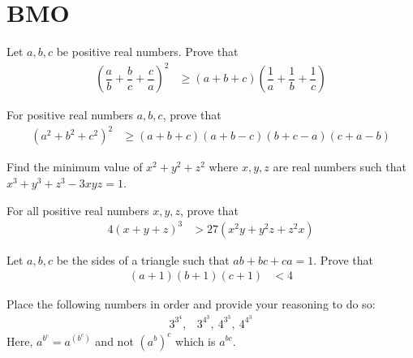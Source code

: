 \documentclass{subfile}
\begin{document}
	\section{BMO}\label{sec:bmo}
	
		\begin{problem}
			Let $a,b,c$ be positive real numbers. Prove that
				\begin{align*}
					\left(\dfrac{a}{b}+\dfrac{b}{c}+\dfrac{c}{a}\right)^{2}
						& \geq (a+b+c)\left(\dfrac{1}{a}+\dfrac{1}{b}+\dfrac{1}{c}\right)
				\end{align*}
		\end{problem}
	
		\begin{problem}
			For positive real numbers $a,b,c$, prove that
				\begin{align*}
					(a^{2}+b^{2}+c^{2})^{2}
						& \geq(a+b+c)(a+b-c)(b+c-a)(c+a-b)
				\end{align*}
		\end{problem}
	
		\begin{problem}
			Find the minimum value of $x^{2}+y^{2}+z^{2}$ where $x,y,z$ are real numbers such that $x^{3}+y^{3}+z^{3}-3xyz=1$.
		\end{problem}
	
		\begin{problem}
			For all positive real numbers $x,y,z$, prove that
				\begin{align*}
					4(x+y+z)^{3}
						& > 27(x^{2}y+y^{2}z+z^{2}x)
				\end{align*}
		\end{problem}
	
		\begin{problem}
			Let $a,b,c$ be the sides of a triangle such that $ab+bc+ca=1$. Prove that
				\begin{align*}
					(a+1)(b+1)(c+1)
						& < 4
				\end{align*}
		\end{problem}
	
		\begin{problem}
			Place the following numbers in order and provide your reasoning to do so:
				\begin{align*}
					3^{3^{4}},
						& 3^{4^{3}},~4^{3^{3}},~4^{4^{3}}
				\end{align*}
			Here, $a^{b^{c}}=a^{\left(b^{c}\right)}$ and not $\left(a^{b}\right)^{c}$ which is $a^{bc}$.
		\end{problem}
\end{document}

